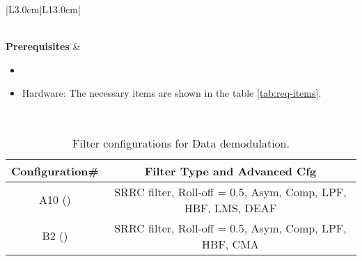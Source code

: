 \begin{table}[H]
\begin{tabular}{|L{3.0cm}|L{13.0cm}|}
\begin{minipage}[t]{\linewidth}
\begin{itemize}[nosep,after=\strut]
				\end{itemize}
			\end{minipage}\\\hline
			\textbf{Prerequisites} & 
			\begin{minipage}[t]{\linewidth}
				\begin{itemize}[nosep,after=\strut]
					\item \preReqPro
					\item Hardware: The necessary items are shown in the table \ref{tab:req-items}.
				\end{itemize} 
			\end{minipage}\\\hline
		\end{tabular}
	\caption{Procedure \subprocid{} description. } \label{tb:ewctxfilter}
\end{table}


\begin{table}[H]
	\centering
	\begin{tabular}{|c|c|}
\hline
 Configuration\# & Filter Type and Advanced Cfg \\\hline
A10 ({comssrptP}) & SRRC filter, Roll-off = 0.5, Asym, Comp, LPF, HBF, LMS, DEAF \\\hline
B2 ({comssrptP}) & SRRC filter, Roll-off = 0.5, Asym, Comp, LPF, HBF, CMA \\\hline

\end{tabular}
	\caption{Filter configurations for Data demodulation.}
	\label{tab:data-advanced}
\end{table}



